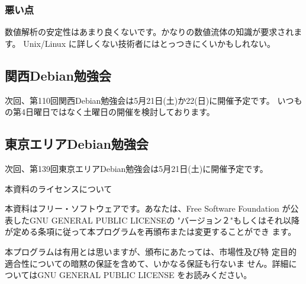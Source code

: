 \documentclass[mingoth,a4paper]{jsarticle}
\begin{document}
\subsubsection{悪い点}
数値解析の安定性はあまり良くないです。かなりの数値流体の知識が要求されます。
Unix/Linux に詳しくない技術者にはとっつきにくいかもしれない。



\subsection{関西Debian勉強会}
次回、第110回関西Debian勉強会は5月21日(土)か22(日)に開催予定です。
いつもの第4日曜日ではなく土曜日の開催を検討しております。

\subsection{東京エリアDebian勉強会}
次回、第139回東京エリアDebian勉強会は5月21日(土)に開催予定です。

%
\mbox{}\newpage
\mbox{}\newpage
\mbox{}\newpage

\pagebreak

\begin{center}
本資料のライセンスについて
\end{center}

本資料はフリー・ソフトウェアです。あなたは、Free Software
Foundation が公表したGNU GENERAL PUBLIC LICENSEの "バージョン２"もしくはそれ以降
が定める条項に従って本プログラムを再頒布または変更することができ
ます。

本プログラムは有用とは思いますが、頒布にあたっては、市場性及び特
定目的適合性についての暗黙の保証を含めて、いかなる保証も行ないま
せん。詳細についてはGNU GENERAL PUBLIC LICENSE をお読みください。
\end{document}
